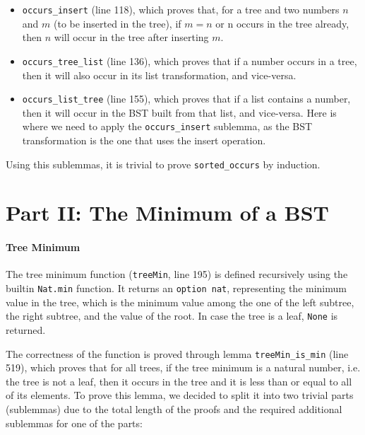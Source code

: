 \documentclass[a4paper]{article}
\begin{document}
\begin{itemize}
    \item \texttt{occurs\_insert} (line 118), which proves that, for a tree and two numbers $n$ and $m$ (to be inserted in the tree), if $m=n$ or n occurs in the tree already, then $n$ will occur in the tree after inserting $m$. 
    \item \texttt{occurs\_tree\_list} (line 136), which proves that if a number occurs in a tree, then it will also occur in its list transformation, and vice-versa.
    \item \texttt{occurs\_list\_tree} (line 155), which proves that if a list contains a number, then it will occur in the BST built from that list, and vice-versa. Here is where we need to apply the \texttt{occurs\_insert} sublemma, as the BST transformation is the one that uses the insert operation.
\end{itemize}

Using this sublemmas, it is trivial to prove \texttt{sorted\_occurs} by induction.

\section{Part II: The Minimum of a BST}

\paragraph{Tree Minimum} The tree minimum function (\texttt{treeMin}, line 195) is defined recursively using the builtin \texttt{Nat.min} function. It returns an \texttt{option nat}, representing the minimum value in the tree, which is the minimum value among the one of the left subtree, the right subtree, and the value of the root. In case the tree is a leaf, \texttt{None} is returned.

The correctness of the function is proved through lemma \texttt{treeMin\_is\_min} (line 519), which proves that for all trees, if the tree minimum is a natural number, i.e. the tree is not a leaf, then it occurs in the tree and it is less than or equal to all of its elements. To prove this lemma, we decided to split it into two trivial parts (sublemmas) due to the total length of the proofs and the required additional sublemmas for one of the parts:
\end{document}
